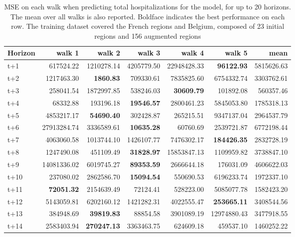\begin{table}[H]
\centering
\caption{MSE on each walk when predicting total hospitalizations for the model, for up to 20 horizons. The mean over all walks is also reported. Boldface indicates the best performance on each row. The training dataset covered the French regions and Belgium, composed of 23 initial regions and 156 augmented regions }
\label{tab:MSE_walk_dense_model}
\begin{tabular}{lrrrrrr}
\toprule
Horizon &      walk 1 &     walk 2 &     walk 3 &      walk 4 &      walk 5 &       mean \\
\midrule
t+1  & 617524.22  & 1210278.14  & 4205779.50  & 22948428.33  & \textbf{96122.93}  & 5815626.63  \\
t+2  & 1217463.30  & \textbf{1860.83}  & 709330.61  & 7835825.60  & 6754332.74  & 3303762.61  \\
t+3  & 258041.54  & 1872997.85  & 538246.03  & \textbf{30609.79}  & 101892.08  & 560357.46  \\
t+4  & 68332.88  & 193196.18  & \textbf{19546.57}  & 2800461.23  & 5845053.80  & 1785318.13  \\
t+5  & 4853217.17  & \textbf{54690.40}  & 302428.87  & 265215.51  & 9347137.04  & 2964537.79  \\
t+6  & 27913284.74  & 3336589.61  & \textbf{10635.28}  & 60760.69  & 2539721.87  & 6772198.44  \\
t+7  & 4063060.58  & 1013744.10  & 1426107.77  & 7476302.17  & \textbf{184426.35}  & 2832728.19  \\
t+8  & 1247490.08  & 451109.49  & \textbf{31828.97}  & 15853847.13  & 1109959.82  & 3738847.10  \\
t+9  & 14081336.02  & 6019745.27  & \textbf{89353.59}  & 2666644.18  & 176031.09  & 4606622.03  \\
t+10  & 237080.02  & 2862586.70  & \textbf{15094.54}  & 550690.53  & 6196233.74  & 1972337.10  \\
t+11  & \textbf{72051.32}  & 2154639.49  & 72124.41  & 528223.00  & 5085077.78  & 1582423.20  \\
t+12  & 5143059.81  & 6202160.12  & 1421282.31  & 4022555.47  & \textbf{253665.11}  & 3408544.56  \\
t+13  & 384948.69  & \textbf{39819.83}  & 88854.58  & 3901089.19  & 12974880.43  & 3477918.55  \\
t+14  & 2583403.94  & \textbf{270247.13}  & 3363463.75  & 624609.18  & 459537.10  & 1460252.22  \\

\end{tabular}
\end{table}
